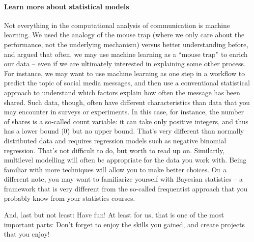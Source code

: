 \paragraph{Learn more about statistical models} Not everything in the computational analysis of communication is machine learning. We used the analogy of the mouse trap (where we only care about the performance, not the underlying mechanism) versus better understanding before, and argued that often, we may use machine learning as a ``mouse trap'' to enrich our data -- even if we are ultimately interested in explaining some other process. For instance, we may want to use machine learning as one step in a workflow to predict the topic of social media messages, and then use a conventional statistical approach to understand which factors explain how often the message has been shared. Such data, though, often have different characteristics than data that you may encounter in surveys or experiments. In this case, for instance, the number of shares is a so-called count variable: it can take only positive integers, and thus has a lower bound (0) but no upper bound. That's very different than normally distributed data and requires regression models such as negative binomial regression. That's not difficult to do, but worth to read up on. Similarily, multilevel modelling will often be appropriate for the data you work with. Being familiar with more techniques will allow you to make better choices. On a different note, you may want to familiarize yourself with Bayesian statistics -- a framework that is very different from the so-called frequentist approach that you probably know from your statistics courses.


And, last but not least: Have fun! At least for us, that is one of the most important parts: Don't forget to enjoy the skills you gained, and create projects that you enjoy!




